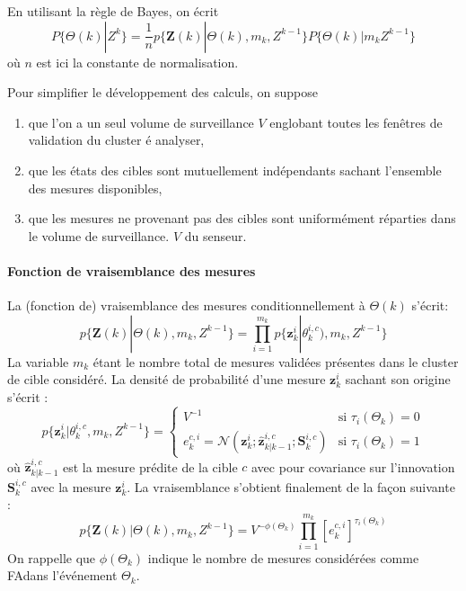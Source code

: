 \documentclass[10pt,french,a4paper]{report}
\begin{document}
	En utilisant la règle de Bayes, on écrit
	 \begin{equation}
	 \label{eq:JPDAFProbaAssociation}
P\{\Theta(k) | Z^k\} = \frac{1}{n}p\{\mathbf{Z}(k)|\Theta(k),m_k,Z^{k-1}\}P\{\Theta(k) |m_k Z^{k-1}\}
 	  \end{equation}  
	où $n$ est ici la constante de normalisation.
	
	
	Pour simplifier le développement des calculs, on suppose
	\begin{enumerate}[label=\arabic*.]
\item que l'on a un seul volume de surveillance $V$ englobant toutes les fenêtres de validation du cluster é
analyser,
\item que les états des cibles sont mutuellement indépendants sachant l'ensemble des mesures
disponibles,
\item que les mesures ne provenant pas des cibles sont uniformément réparties dans le volume de surveillance.
$V$ du senseur.
	\end{enumerate}
	\paragraph{Fonction de vraisemblance des mesures}
	La (fonction de) vraisemblance des mesures conditionnellement à $\Theta(k)$ s'écrit:
	 \begin{equation}
 p\{\mathbf{Z}(k)|\Theta(k),m_k,Z^{k-1}\}= \prod_{i=1}^{m_k}  p\{\mathbf{z}_k^i|\theta_k^{i,c}),m_k,Z^{k-1}\}
 	  \end{equation}  
La variable $m_k$ étant le nombre total de mesures validées présentes dans le cluster de cible considéré. La densité de probabilité d'une mesure $\mathbf{z}_k^i$ sachant son origine s'écrit :
	 \begin{equation}
p\{\mathbf{z}_k^i|\theta_k^{i,c},m_k,Z^{k-1}\} = 
\begin{cases}
V^{-1} & \mbox{si } \tau_i(\Theta_k) =0\\
e_k^{c,i} = \mathcal{N}(\mathbf{z}^i_k;\hat{\mathbf{z}}^{i,c}_{k|k-1};\mathbf{S}^{i,c}_k) & \mbox{si } \tau_i(\Theta_k) =1
\end{cases}
 	  \end{equation}  
 où $\hat{\mathbf{z}}^{i,c}_{k|k-1}$ est la mesure prédite de la cible $c$ avec pour covariance sur l'innovation $\mathbf{S}^{i,c}_k$ avec la mesure  $\mathbf{z}_k^i$. La vraisemblance s'obtient finalement de la façon suivante :
 	 \begin{equation}
 	 \label{eq:JPDAFVraisemblance}
 p\{\mathbf{Z}(k)|\Theta(k),m_k,Z^{k-1}\}= V^{- \phi(\Theta_k) }  \prod_{i=1}^{m_k}   {[e_k^{c,i}]}^ {\tau_i(\Theta_k)}
 	  \end{equation}  
 On rappelle que $\phi(\Theta_k)$ indique le nombre de mesures considérées comme \acf{FA}dans l'événement $\Theta_k$.
 
\end{document}

